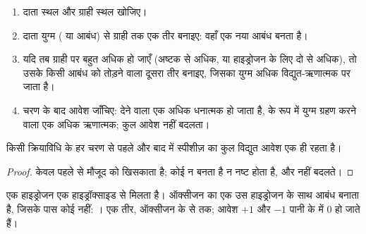\begin{method}[वक्र तीर बनाना]\label{met:g12:curly-arrows:drawing}
\begin{enumerate}
  \item दाता स्थल और ग्राही स्थल खोजिए।
  \item दाता युग्म ( या आबंध) से ग्राही  तक एक तीर
        बनाइए: वहाँ एक नया आबंध बनता है।
  \item यदि तब ग्राही  पर बहुत अधिक  हो जाएँ (अष्टक से
        अधिक, या हाइड्रोजन के लिए दो से अधिक), तो उसके किसी आबंध को तोड़ने वाला
        दूसरा तीर बनाइए, जिसका युग्म अधिक
        विद्युत-ऋणात्मक  पर जाता है।
  \item चरण के बाद आवेश जाँचिए:  देने वाला 
        एक अधिक धनात्मक हो जाता है,  के रूप में युग्म ग्रहण करने वाला 
        एक अधिक ऋणात्मक; कुल आवेश नहीं बदलता।
\end{enumerate}
\end{method}

\begin{proposition}\label{prop:g12:curly-arrows:charge}
किसी क्रियाविधि के हर चरण से पहले और बाद में स्पीशीज़ का कुल विद्युत आवेश
एक ही रहता है।
\end{proposition}

\begin{proof}
 केवल पहले से मौजूद  को खिसकाता है; कोई 
न बनता है न नष्ट होता है, और  नहीं बदलते।
\end{proof}

\begin{example}[पहला तीर]\label{ex:g12:curly-arrows:first}
एक हाइड्रोजन   एक हाइड्रॉक्साइड   से मिलता है। ऑक्सीजन का
एक  उस हाइड्रोजन  के साथ आबंध बनाता है, जिसके पास कोई  नहीं:
। एक तीर, ऑक्सीजन के  से
 तक; आवेश $+1$ और $-1$ पानी के  में 0 हो जाते हैं।
\end{example}

